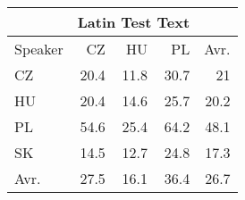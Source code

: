 \begin{tabular}{l|rrr|r}
\hline
 & \multicolumn{3}{c}{Latin Test Text} & \\
\hline
 Speaker   &   CZ &   HU &   PL &   Avr. \\
\hline
 CZ        & 20.4 & 11.8 & 30.7 &   21   \\
 HU        & 20.4 & 14.6 & 25.7 &   20.2 \\
 PL        & 54.6 & 25.4 & 64.2 &   48.1 \\
 SK        & 14.5 & 12.7 & 24.8 &   17.3 \\
\hline
 Avr.     & 27.5 & 16.1 & 36.4 &   26.7 \\
\hline
\end{tabular}